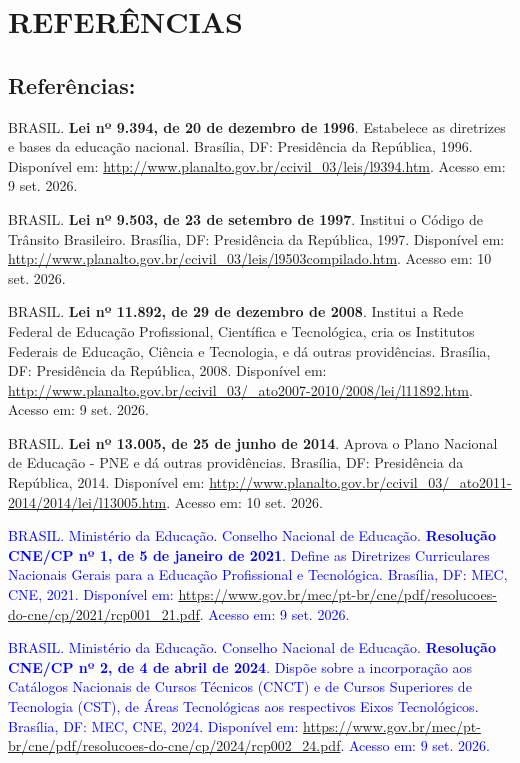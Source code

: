 \documentclass{../../modelos/latex-shared/ifsc-ppc}
\newcommand{\revisao}[1]{\textcolor{blue}{#1}}
\newcommand{\revisao}[1]{#1}
\begin{document}
\section{REFERÊNCIAS}
\subsection{Referências:}

{\raggedright
\linespread{1.0}\selectfont
\setlength{\parindent}{0pt}
\setlength{\parskip}{\baselineskip}

BRASIL. \textbf{Lei nº 9.394, de 20 de dezembro de 1996}. Estabelece as diretrizes e bases da educação nacional. Brasília, DF: Presidência da República, 1996. Disponível em: \url{http://www.planalto.gov.br/ccivil_03/leis/l9394.htm}. Acesso em: 9 set. 2026.

BRASIL. \textbf{Lei nº 9.503, de 23 de setembro de 1997}. Institui o Código de Trânsito Brasileiro. Brasília, DF: Presidência da República, 1997. Disponível em: \url{http://www.planalto.gov.br/ccivil_03/leis/l9503compilado.htm}. Acesso em: 10 set. 2026.

BRASIL. \textbf{Lei nº 11.892, de 29 de dezembro de 2008}. Institui a Rede Federal de Educação Profissional, Científica e Tecnológica, cria os Institutos Federais de Educação, Ciência e Tecnologia, e dá outras providências. Brasília, DF: Presidência da República, 2008. Disponível em: \url{http://www.planalto.gov.br/ccivil_03/_ato2007-2010/2008/lei/l11892.htm}. Acesso em: 9 set. 2026.

BRASIL. \textbf{Lei nº 13.005, de 25 de junho de 2014}. Aprova o Plano Nacional de Educação - PNE e dá outras providências. Brasília, DF: Presidência da República, 2014. Disponível em: \url{http://www.planalto.gov.br/ccivil_03/_ato2011-2014/2014/lei/l13005.htm}. Acesso em: 10 set. 2026.

\revisao{BRASIL. Ministério da Educação. Conselho Nacional de Educação. \textbf{Resolução CNE/CP nº 1, de 5 de janeiro de 2021}. Define as Diretrizes Curriculares Nacionais Gerais para a Educação Profissional e Tecnológica. Brasília, DF: MEC, CNE, 2021. Disponível em: \url{https://www.gov.br/mec/pt-br/cne/pdf/resolucoes-do-cne/cp/2021/rcp001_21.pdf}. Acesso em: 9 set. 2026.}

\revisao{BRASIL. Ministério da Educação. Conselho Nacional de Educação. \textbf{Resolução CNE/CP nº 2, de 4 de abril de 2024}. Dispõe sobre a incorporação aos Catálogos Nacionais de Cursos Técnicos (CNCT) e de Cursos Superiores de Tecnologia (CST), de Áreas Tecnológicas aos respectivos Eixos Tecnológicos. Brasília, DF: MEC, CNE, 2024. Disponível em: \url{https://www.gov.br/mec/pt-br/cne/pdf/resolucoes-do-cne/cp/2024/rcp002_24.pdf}. Acesso em: 9 set. 2026.}

}
\end{document}
